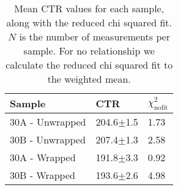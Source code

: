 \begin{table}
\caption{\label{tab:doiresults} Mean CTR values for each sample, along with the reduced chi squared fit. $N$ is the number of measurements per sample. For no relationship we calculate the reduced chi squared fit to the weighted mean.}
\begin{tabular}{lll}
\hline
Sample &            CTR &   $\chi^2_\text{nofit}$ \\
\hline
   30A - Unwrapped &  204.6$\pm$1.5 &  1.73 \\
   30B - Unwrapped &  207.4$\pm$1.3 &  2.58 \\
   30A - Wrapped &  191.8$\pm$3.3 &  0.92 \\
   30B - Wrapped &  193.6$\pm$2.6 &  4.98 \\
\hline
\end{tabular}
\end{table}